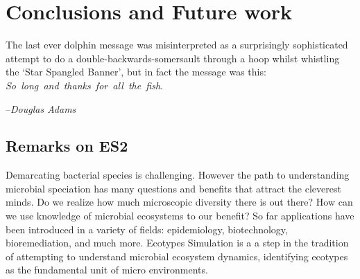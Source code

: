 \gobbletocpage
\chapter{Conclusions and Future work}
\restoretocpage

\begin{shadequote}
The last ever dolphin message was misinterpreted as a surprisingly sophisticated attempt to do a double-backwards-somersault through a hoop whilst whistling the `Star Spangled Banner', but in fact the message was this: \mbox{\emph{So long and thanks for all the fish}}. \par--\emph{Douglas Adams}
\end{shadequote}


\section{Remarks on ES2}
Demarcating bacterial species is challenging.
However the path to understanding microbial speciation has many questions and benefits that attract the cleverest minds.
Do we realize how much microscopic diversity there is out there?
How can we use knowledge of microbial ecosystems to our benefit?
So far applications have been introduced in a variety of fields: epidemiology, biotechnology, bioremediation, and much more.
Ecotypes Simulation is a a step in the tradition of attempting to understand microbial ecosystem dynamics, identifying ecotypes as the fundamental unit of micro environments.



